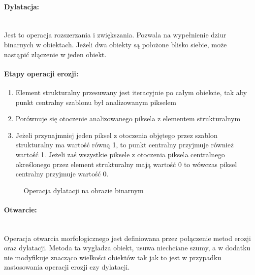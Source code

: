 \documentclass[a4paper,12pt,twoside,openany]{report}
\newcommand{\ImgPath}{.}
\begin{document}
\paragraph{Dylatacja:}\mbox{} \\
Jest to operacja rozszerzania i zwiększania. Pozwala na wypełnienie dziur binarnych w obiektach. Jeżeli dwa obiekty są położone blisko siebie, może nastąpić złączenie w jeden obiekt.

\paragraph{Etapy operacji erozji:}
\begin{enumerate}
	\item Element strukturalny przesuwany jest iteracyjnie po całym obiekcie, tak aby punkt centralny szablonu był analizowanym pikselem
	\item Porównuje się otoczenie analizowanego piksela z elementem strukturalnym
	\item Jeżeli przynajmniej jeden piksel z otoczenia objętego przez szablon strukturalny ma wartość równą 1, to punkt centralny przyjmuje również wartość 1. Jeżeli zaś wszystkie piksele z otoczenia piksela centralnego określonego przez element strukturalny mają wartość 0 to wówczas piksel centralny przyjmuje wartość 0.
\end{enumerate}

\begin{figure}[H]
	\centering
	\caption{Operacja dylatacji na obrazie binarnym}
\end{figure}

\paragraph{Otwarcie:}\mbox{} \\
Operacja otwarcia morfologicznego jest definiowana przez połączenie metod erozji oraz dylatacji. Metoda ta wygładza obiekt, usuwa niechciane szumy, a w dodatku nie modyfikuje znacząco wielkości obiektów tak jak to jest w przypadku zastosowania operacji erozji czy dylatacji.
\end{document}
